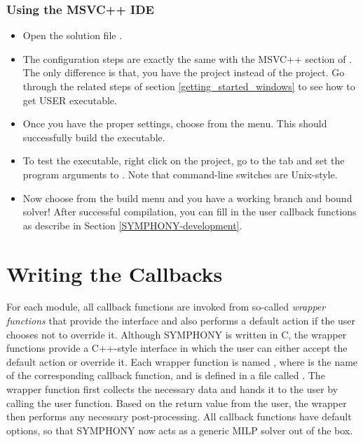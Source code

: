 \subsubsection{Using the MSVC++ IDE}

\begin{itemize}
\item Open the solution file .

\item 
The configuration steps are exactly the same with the MSVC++ section of 
. The only 
difference is that, you have the  project instead of the
 project. Go through the related steps of section 
\ref{getting_started_windows} to see how to get USER executable. 

\item
Once you have the proper settings, choose  from the  menu. This should successfully 
build the executable.

\item
To test the executable, right click on the  project, go to the
 tab and set the program arguments to 
. Note that command-line switches are 
Unix-style.

\item
Now choose  from the build menu and you have a working branch
and bound solver! After successful compilation, you can fill in the user
callback functions as describe in Section \ref{SYMPHONY-development}.
\end{itemize}

\section{Writing the Callbacks}

For each module, all callback functions are invoked from so-called
\emph{wrapper functions} that provide the interface and also performs a
default action if the user chooses not to override it. Although SYMPHONY is
written in C, the wrapper functions provide a C++-style interface in which the
user can either accept the default action or override it. Each wrapper
function is named  , where \code{*} is the name of the
corresponding callback function, and is defined in a file called
. The wrapper function first collects the necessary data
and hands it to the user by calling the user function. Based on the return
value from the user, the wrapper then performs any necessary post-processing.
All callback functions have default options, so that SYMPHONY now acts as a
generic MILP solver out of the box.

